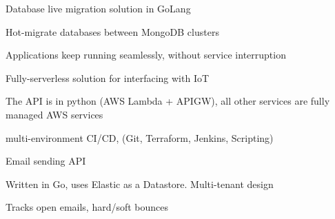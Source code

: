 


\begin{cventries}

\cventry
{} %
{Database live migration solution in GoLang} %
{} %
{} %
{ %
\begin{cvitems}
\item {Hot-migrate databases between MongoDB clusters}
\item {Applications keep running seamlessly, without service interruption}
\end{cvitems}
}




\cventry
{} %
{Fully-serverless solution for interfacing with IoT} %
{} %
{} %
{ %
\begin{cvitems}
\item {The API is in python (AWS Lambda + APIGW), all other services are fully managed AWS services}
\item {multi-environment CI/CD, (Git, Terraform, Jenkins, Scripting)}
\end{cvitems}
}


\cventry
{} %
{Email sending API} %
{} %
{} %
{ %
\begin{cvitems}
\item {Written in Go, uses Elastic as a Datastore. Multi-tenant design}
\item {Tracks open emails, hard/soft bounces}
\end{cvitems}
}






\end{cventries}